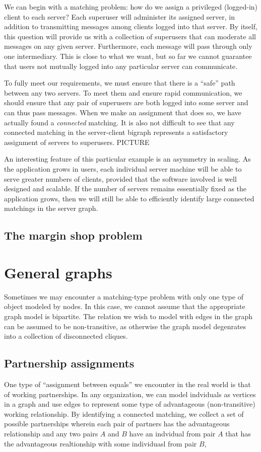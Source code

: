 We can begin with a matching problem: how do we assign a privileged (logged-in) client to each server?  Each superuser will administer its assigned server, in addition to transmitting messages among clients logged into that server.  By itself, this question will provide us with a collection of superusers that can moderate all messages on any given server.  Furthermore, each message will pass through only one intermediary.  This is close to what we want, but so far we cannot guarantee that users not mutually logged into any particular server can communicate.

To fully meet our requirements, we must ensure that there is a ``safe'' path between any two servers.  To meet them and ensure rapid communication, we should ensure that any pair of superusers are both logged into some server and can thus pass messages.  When we make an assignment that does so, we have actually found a {\it connected} matching.  It is also not difficult to see that any connected matching in the server-client bigraph represents a satisfactory assignment of servers to superusers.  PICTURE

An interesting feature of this particular example is an asymmetry in scaling.  As the application grows in users, each individual server machine will be able to serve greater numbers of clients, provided that the software involved is well designed and scalable.  If the number of servers remains essentially fixed as the application grows, then we will still be able to efficiently identify large connected matchings in the server graph.

	\subsection{The margin shop problem}


\section{General graphs}

Sometimes we may encounter a matching-type problem with only one type of object modeled by nodes.  In this case, we cannot assume that the appropriate graph model is bipartite.  The relation we wish to model with edges in the graph can be assumed to be non-transitive, as otherwise the graph model degenrates into a collection of disconnected cliques.
	\subsection{Partnership assignments}
One type of ``assignment between equals'' we encounter in the real world is that of working partnerships.  In any organization, we can model indviduals as vertices in a graph and use edges to represent some type of advantageous (non-transitive) working relationship.  By identifying a connected matching, we collect a set of possible partnerships wherein each pair of partners has the advantageous relationship and any two pairs $A$ and $B$ have an indvidual from pair $A$ that has the advantageous realtionship with some individuasl from pair $B$,

